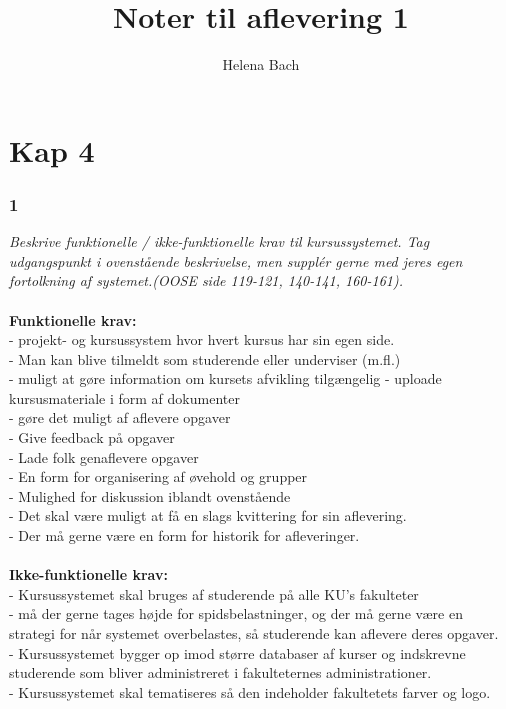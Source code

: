 \documentclass[12pt]{article}
\title{Noter til aflevering 1}
\author{Helena Bach}
\begin{document}
\maketitle

\section*{Kap 4}
\subsubsection*{1}
\textit{ Beskrive funktionelle / ikke-funktionelle krav til kursussystemet. Tag udgangspunkt
i ovenstående beskrivelse, men supplér gerne med jeres egen fortolkning af systemet.(OOSE side 119-121, 140-141, 160-161).
}\\\\
\textbf{Funktionelle krav:}\\
- projekt- og kursussystem hvor hvert kursus har sin egen side.\\
- Man kan blive tilmeldt som studerende eller underviser (m.fl.)\\
- muligt at gøre information om kursets afvikling tilgængelig
- uploade kursusmateriale i form af dokumenter\\
- gøre det muligt af aflevere opgaver\\
- Give feedback på opgaver\\
- Lade folk genaflevere opgaver\\
- En form for organisering af øvehold og grupper\\
- Mulighed for diskussion iblandt ovenstående\\
- Det skal være muligt at få en slags kvittering for sin aflevering.\\
- Der må gerne være en form for historik for afleveringer.\\\\
 \textbf{Ikke-funktionelle krav:}\\
- Kursussystemet skal bruges af studerende på alle KU’s fakulteter\\
- må der gerne tages højde for spidsbelastninger, og der må gerne være en strategi for når systemet overbelastes, så studerende kan aflevere deres opgaver.\\
- Kursussystemet bygger op imod større databaser af kurser og indskrevne studerende som bliver administreret i fakulteternes administrationer.\\
- Kursussystemet skal tematiseres så den indeholder fakultetets farver og logo.\\
\end{document}
